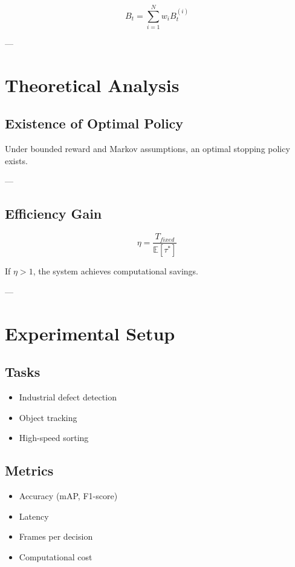 \documentclass[journal]{IEEEtran}
\begin{document}
\begin{equation}
B_t = \sum_{i=1}^{N} w_i B_t^{(i)}
\end{equation}

---

\section{Theoretical Analysis}

\subsection{Existence of Optimal Policy}

Under bounded reward and Markov assumptions, an optimal stopping policy exists.

---

\subsection{Efficiency Gain}

\begin{equation}
\eta = \frac{T_{fixed}}{\mathbb{E}[\tau^*]}
\end{equation}

If $\eta > 1$, the system achieves computational savings.

---

\section{Experimental Setup}

\subsection{Tasks}
\begin{itemize}
    \item Industrial defect detection
    \item Object tracking
    \item High-speed sorting
\end{itemize}

\subsection{Metrics}
\begin{itemize}
    \item Accuracy (mAP, F1-score)
    \item Latency
    \item Frames per decision
    \item Computational cost
\end{itemize}
\end{document}

